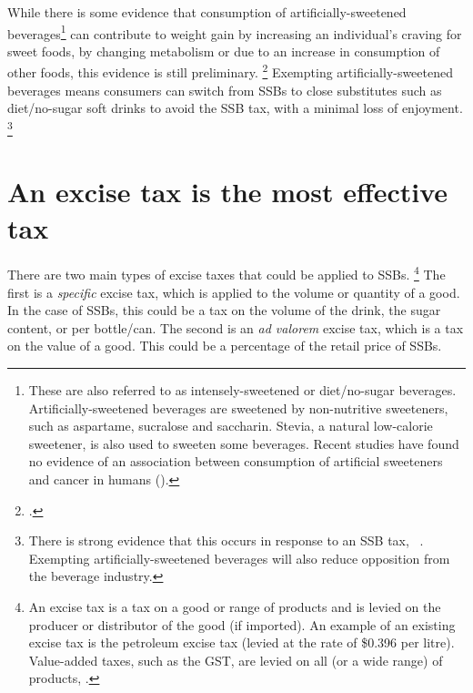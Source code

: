 \documentclass[embargoed]{grattan}
\begin{document}
While there is some evidence that consumption of artificially-sweetened beverages\footnote{These are also referred to as intensely-sweetened or diet/no-sugar beverages.
Artificially-sweetened beverages are sweetened by non-nutritive sweeteners, such as aspartame, sucralose and saccharin.
Stevia, a natural low-calorie sweetener, is also used to sweeten some beverages.
Recent studies have found no evidence of an association between consumption of artificial sweeteners and cancer in humans (\textcites{Institute2009ArtificialSweetenersCancer}{CancerCouncil2015Artificialsweetenersdo}).} can contribute to weight gain by increasing an individual's craving for sweet foods, by changing metabolism or due to an increase in consumption of other foods, this evidence is still preliminary.%
\footcites{Mattes2009Nonnutritivesweetenerconsumption}{Popkin2012Sugarybeveragesrepresent}{Yang2010Gainweightgoing}{Swithers2013Artificialsweetenersproduce}{Green2012Alteredprocessingsweet}{Fowler2008Fuelingobesityepidemic}{Friedman2012Sugarsweetenedbeverage} Exempting artificially-sweetened beverages means consumers can switch from SSBs to close substitutes such as diet/no-sugar soft drinks to avoid the SSB tax, with a minimal loss of enjoyment.%
\footnote{There is strong evidence that this occurs in response to an SSB tax, \eg~\textcites{Briggs2013Overallincomespecific}{Sharma2014effectstaxingsugarsweetened}{Zhen2010Habitformationdemand}.
Exempting artificially-sweetened beverages will also reduce opposition from the beverage industry.}

\section{An excise tax is the most effective tax}\label{an-excise-tax-is-the-most-effective-tax}

There are two main types of excise taxes that could be applied to SSBs.%
\footnote{An excise tax is a tax on a good or range of products and is levied on the producer or distributor of the good (if imported).
An example of an existing excise tax is the petroleum excise tax (levied at the rate of \$0.396 per litre).
Value-added taxes, such as the GST, are levied on all (or a wide range) of products, \textcite{CnossenExcisetaxationAustralia}.} The first is a \emph{specific} excise tax, which is applied to the volume or quantity of a good.
In the case of SSBs, this could be a tax on the volume of the drink, the sugar content, or per bottle/can.
The second is an \emph{ad valorem} excise tax, which is a tax on the value of a good.
This could be a percentage of the retail price of SSBs.
\end{document}
